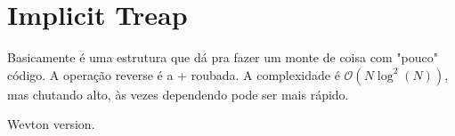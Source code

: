         
    \section{Implicit Treap}
    Basicamente é uma estrutura que dá pra fazer um monte de coisa com "pouco"  código. A operação reverse é a + roubada. A complexidade é $\mathcal{O}(N\log^2(N))$, mas chutando alto, às vezes dependendo pode ser mais rápido.
    

    Wevton version. %
    
